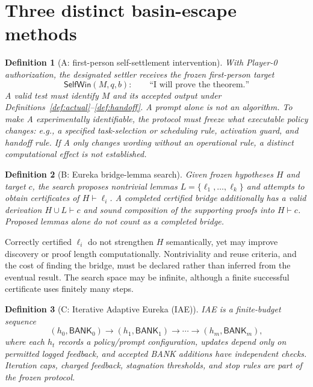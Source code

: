 \documentclass[11pt,letterpaper]{article}
\newtheorem{definition}{Definition}[section]
\theoremstyle{remark}
\newcommand{\BANK}{\mathsf{BANK}}
\newcommand{\SelfWin}{\mathsf{SelfWin}}
\begin{document}
\section{Three distinct basin-escape methods}
\begin{definition}[A: first-person self-settlement intervention]\label{def:A}
With Player-0 authorization, the designated settler receives the frozen first-person target
\[\SelfWin(M,q,b):\qquad\text{``I will prove the theorem.''}\]
A valid test must identify $M$ and its accepted output under Definitions~\ref{def:actual}--\ref{def:handoff}. A prompt alone is not an algorithm. To make A experimentally identifiable, the protocol must freeze \emph{what executable policy changes}: e.g., a specified task-selection or scheduling rule, activation guard, and handoff rule. If A only changes wording without an operational rule, a distinct computational effect is not established.
\end{definition}
\begin{definition}[B: Eureka bridge-lemma search]\label{def:B}
Given frozen hypotheses $H$ and target $c$, the search proposes nontrivial lemmas $L=\{\ell_1,\ldots,\ell_k\}$ and attempts to obtain certificates of $H\vdash\ell_i$. A \emph{completed certified bridge} additionally has a valid derivation $H\cup L\vdash c$ and sound composition of the supporting proofs into $H\vdash c$. Proposed lemmas alone do not count as a completed bridge.
\end{definition}
Correctly certified $\ell_i$ do not strengthen $H$ semantically, yet may improve discovery or proof length computationally. Nontriviality and reuse criteria, and the cost of finding the bridge, must be declared rather than inferred from the eventual result. The search space may be infinite, although a finite successful certificate uses finitely many steps.
\begin{definition}[C: Iterative Adaptive Eureka (IAE)]
IAE is a finite-budget sequence
\[(h_0,\BANK_0)\longrightarrow(h_1,\BANK_1)\longrightarrow\cdots\longrightarrow(h_m,\BANK_m),\]
where each $h_t$ records a policy/prompt configuration, updates depend only on permitted logged feedback, and accepted BANK additions have independent checks. Iteration caps, charged feedback, stagnation thresholds, and stop rules are part of the frozen protocol.
\end{definition}
\end{document}

